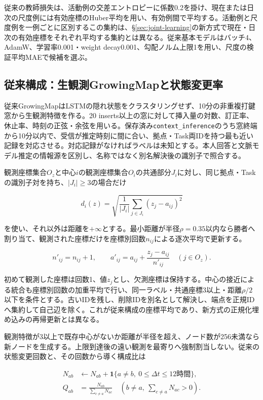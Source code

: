 従来の教師損失は、活動例の交差エントロピーに係数0.2を掛け、現在または日次の尺度例には有効座標のHuber平均を用い、有効例間で平均する。活動例と尺度例を一例ごとに区別するこの集約は、§\ref{sec:joint-learning}の新方式で現在・日次の有効座標をそれぞれ平均する集約とは異なる。従来基本モデルはバッチ4、AdamW、学習率0.001・weight decay0.001、勾配ノルム上限1を用い、尺度の検証平均MAEで候補を選ぶ。

\subsection{従来構成：生観測GrowingMapと状態変更率}
\label{sec:legacy-transition-ratios}

従来GrowingMapはLSTMの隠れ状態をクラスタリングせず、10分の非重複打鍵窓から生観測特徴を作る。20 inserts以上の窓に対して挿入量の対数、訂正率、休止率、時刻の正弦・余弦を用いる。保存済み\texttt{context\_inference}のうち窓終端から10分以内で、受信が推定時刻に間に合い、拠点・Task両IDを持つ最も近い記録を対応させる。対応記録がなければラベルは未知とする。本人回答と文脈モデル推定の情報源を区別し、名称ではなく別名解決後の識別子で照合する。

観測座標集合\(O_z\)と中心\(i\)の観測座標集合\(O_i\)の共通部分\(J_i\)に対し、同じ拠点・Taskの識別子対を持ち、\(|J_i|\ge3\)の場合だけ

\[
d_i(z)=\sqrt{\frac1{|J_i|}\sum_{j\in J_i}(z_j-a_{ij})^2}
\]

を使い、それ以外は距離を\(+\infty\)とする。最小距離が半径\(\rho=0.35\)以内なら勝者へ割り当て、観測された座標だけを座標別回数\(n_{ij}\)による逐次平均で更新する。

\[
n'_{ij}=n_{ij}+1,\qquad
a'_{ij}=a_{ij}+\frac{z_j-a_{ij}}{n'_{ij}}\quad(j\in O_z).
\]

初めて観測した座標は回数1、値\(z_j\)とし、欠測座標は保持する。中心の接近による統合も座標別回数の加重平均で行い、同一ラベル・共通座標3以上・距離\(\rho/2\)以下を条件とする。古いIDを残し、削除IDを別名として解決し、端点を正規IDへ集約して自己辺を除く。これが従来構成の座標平均であり、新方式の正規化埋め込みの再帰更新とは異なる。

観測特徴が3以上で既存中心がないか距離が半径を超え、ノード数が256未満なら新ノードを生成する。上限到達後の遠い観測を最寄りへ強制割当しない。従来の状態変更回数と、その回数から導く構成比は

\[
\begin{aligned}
N_{ab}&\leftarrow N_{ab}+\mathbf1\{a\ne b,\ 0\le\Delta t\le12\text{時間}\},\\
Q_{ab}&=\frac{N_{ab}}{\sum_{c\ne a}N_{ac}}
\quad\left(b\ne a,\ \sum_{c\ne a}N_{ac}>0\right).
\end{aligned}
\]

